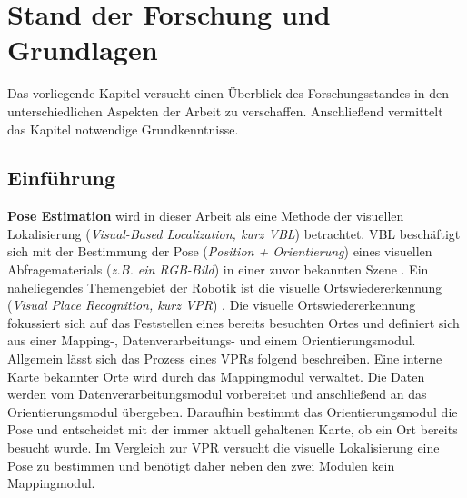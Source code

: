 
\section{Stand der Forschung und Grundlagen}

Das vorliegende Kapitel versucht einen Überblick des Forschungsstandes in den unterschiedlichen Aspekten der Arbeit zu verschaffen. Anschließend vermittelt das Kapitel notwendige Grundkenntnisse.

\subsection{Einführung}



\textbf{Pose Estimation} wird in dieser Arbeit als eine Methode der visuellen Lokalisierung (\textit{Visual-Based Localization, kurz VBL}) betrachtet. VBL beschäftigt sich mit der Bestimmung der Pose (\textit{Position + Orientierung}) eines visuellen Abfragematerials (\textit{z.B. ein RGB-Bild}) in einer zuvor bekannten Szene  \cite{piascoSurveyVisualBasedLocalization2018}.
Ein naheliegendes Themengebiet der Robotik ist die visuelle Ortswiedererkennung (\textit{Visual Place Recognition, kurz VPR}) \cite{lowryVisualPlaceRecognition2016}. Die visuelle Ortswiedererkennung fokussiert sich auf das Feststellen eines bereits besuchten Ortes und definiert sich aus einer Mapping-, Datenverarbeitungs- und einem Orientierungsmodul. Allgemein lässt sich das Prozess eines VPRs folgend beschreiben. Eine interne Karte bekannter Orte wird durch das Mappingmodul verwaltet. Die Daten werden vom Datenverarbeitungsmodul vorbereitet und anschließend an das Orientierungsmodul übergeben. Daraufhin bestimmt das Orientierungsmodul die Pose und entscheidet mit der immer aktuell gehaltenen Karte, ob ein Ort bereits besucht wurde. Im Vergleich zur VPR versucht die visuelle Lokalisierung eine Pose zu bestimmen und benötigt daher neben den zwei Modulen kein Mappingmodul.

